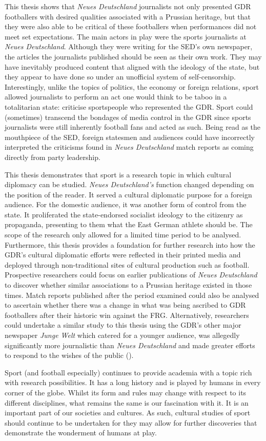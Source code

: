 This thesis shows that \textit{Neues Deutschland} journalists not only presented GDR footballers with desired qualities associated with a Prussian heritage, but that they were also able to be critical of these footballers when performances did not meet set expectations. The main actors in play were the sports journalists at \textit{Neues Deutschland}. Although they were writing for the SED’s own newspaper, the articles the journalists published should be seen as their own work. They may have inevitably produced content that aligned with the ideology of the state, but they appear to have done so under an unofficial system of self-censorship. Interestingly, unlike the topics of politics, the economy or foreign relations, sport allowed journalists to perform an act one would think to be taboo in a totalitarian state: criticise sportspeople who represented the GDR. Sport could (sometimes) transcend the bondages of media control in the GDR since sports journalists were still inherently football fans and acted as such. Being read as the mouthpiece of the SED, foreign statesmen and audiences could have incorrectly interpreted the criticisms found in \textit{Neues Deutschland} match reports as coming directly from party leadership.

This thesis demonstrates that sport is a research topic in which cultural diplomacy can be studied. \textit{Neues Deutschland’s} function changed depending on the position of the reader. It served a cultural diplomatic purpose for a foreign audience. For the domestic audience, it was another form of control from the state. It proliferated the state-endorsed socialist ideology to the citizenry as propaganda, presenting to them what the East German athlete should be. The scope of the research only allowed for a limited time period to be analysed. Furthermore, this thesis provides a foundation for further research into how the GDR’s cultural diplomatic efforts were reflected in their printed media and deployed through non-traditional sites of cultural production such as football. Prospective researchers could focus on earlier publications of \textit{Neues Deutschland} to discover whether similar associations to a Prussian heritage existed in those times. Match reports published after the period examined could also be analysed to ascertain whether there was a change in what was being ascribed to GDR footballers after their historic win against the FRG. Alternatively, researchers could undertake a similar study to this thesis using the GDR’s other major newspaper \textit{Junge Welt} which catered for a younger audience, was allegedly significantly more journalistic than \textit{Neues Deutschland} and made greater efforts to respond to the wishes of the public (\cite{meyenschweiger2008}).

Sport (and football especially) continues to provide academia with a topic rich with research possibilities. It has a long history and is played by humans in every corner of the globe. Whilst its form and rules may change with respect to its different disciplines, what remains the same is our fascination with it. It is an important part of our societies and cultures. As such, cultural studies of sport should continue to be undertaken for they may allow for further discoveries that demonstrate the wonderment of humans at play.